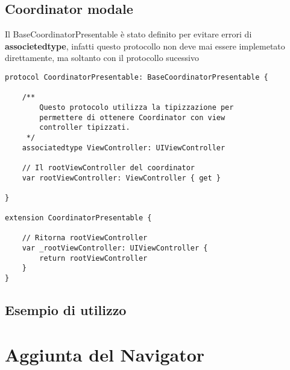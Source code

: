 \subsection{Coordinator modale}

Il BaseCoordinatorPresentable è stato definito per evitare errori di \textbf{associetedtype},
infatti questo protocollo non deve mai essere implemetato direttamente, ma soltanto con il protocollo sucessivo

\begin{verbatim}
protocol CoordinatorPresentable: BaseCoordinatorPresentable {

    /**
        Questo protocolo utilizza la tipizzazione per
        permettere di ottenere Coordinator con view
        controller tipizzati.
     */
    associatedtype ViewController: UIViewController

    // Il rootViewController del coordinator
    var rootViewController: ViewController { get }

}

extension CoordinatorPresentable {

    // Ritorna rootViewController
    var _rootViewController: UIViewController {
        return rootViewController
    }
}
\end{verbatim}

\subsection{Esempio di utilizzo}

\section{Aggiunta del Navigator}